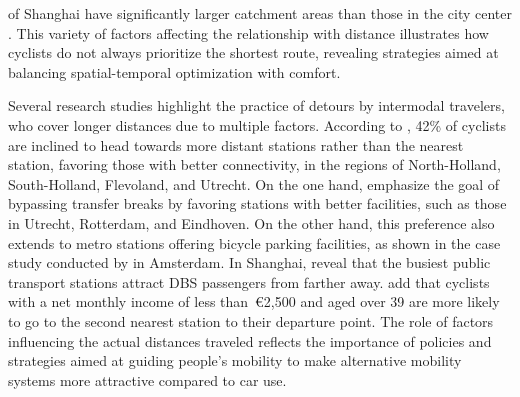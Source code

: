 \begin{refsegment}
of Shanghai have significantly larger catchment areas than those in the city center \textcolor{blue}{\autocite[8]{yu_policy_2021}}. This variety of factors affecting the relationship with distance illustrates how cyclists do not always prioritize the shortest route, revealing strategies aimed at balancing spatial-temporal optimization with comfort.%

Several research studies highlight the practice of detours by intermodal travelers, who cover longer distances due to multiple factors. According to \textcolor{blue}{\textcite[102]{kampen_understanding_2020}}, 42\% of cyclists are inclined to head towards more distant stations rather than the nearest station, favoring those with better connectivity, in the regions of North-Holland, South-Holland, Flevoland, and Utrecht. On the one hand, \textcolor{blue}{\textcite[18]{jonkeren_bicycle-train_2021}} emphasize the goal of bypassing transfer breaks by favoring stations with better facilities, such as those in Utrecht, Rotterdam, and Eindhoven. On the other hand, this preference also extends to metro stations offering bicycle parking facilities, as shown in the case study conducted by \textcolor{blue}{\textcite[342]{kampen_bicycle_2021}} in Amsterdam. In Shanghai, \textcolor{blue}{\textcite[7]{li_exploring_2021}} reveal that the busiest public transport stations attract \acrshort{DBS} passengers from farther away. \textcolor{blue}{\textcite[143]{kampen_understanding_2021}} add that cyclists with a net monthly income of less than~\euro2,500 and aged over 39 are more likely to go to the second nearest station to their departure point. The role of factors influencing the actual distances traveled reflects the importance of policies and strategies aimed at guiding people's mobility to make alternative mobility systems more attractive compared to car use.%


\end{refsegment}
